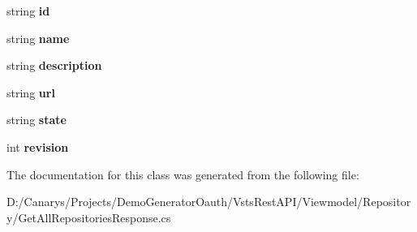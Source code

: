 \begin{DoxyCompactItemize}
\item 
\mbox{\label{class_vsts_rest_a_p_i_1_1_viewmodel_1_1_repository_1_1_get_all_repositories_response_1_1_project_aa93e4a4072d552bdea5a912d2d8b43f8}} 
string {\bfseries id}
\item 
\mbox{\label{class_vsts_rest_a_p_i_1_1_viewmodel_1_1_repository_1_1_get_all_repositories_response_1_1_project_a6f41ccbf88e8fb4ff33bc6472b95cae9}} 
string {\bfseries name}
\item 
\mbox{\label{class_vsts_rest_a_p_i_1_1_viewmodel_1_1_repository_1_1_get_all_repositories_response_1_1_project_a47f4d3463a6b78bf9a33c2718df1b66c}} 
string {\bfseries description}
\item 
\mbox{\label{class_vsts_rest_a_p_i_1_1_viewmodel_1_1_repository_1_1_get_all_repositories_response_1_1_project_ac4682274e4cd61f0adc35f245d61ac2c}} 
string {\bfseries url}
\item 
\mbox{\label{class_vsts_rest_a_p_i_1_1_viewmodel_1_1_repository_1_1_get_all_repositories_response_1_1_project_adad64a69083aa5dcf63f27f3d3b66123}} 
string {\bfseries state}
\item 
\mbox{\label{class_vsts_rest_a_p_i_1_1_viewmodel_1_1_repository_1_1_get_all_repositories_response_1_1_project_aefccc2024ddb73177425f544053ab1d2}} 
int {\bfseries revision}
\end{DoxyCompactItemize}


The documentation for this class was generated from the following file\+:\begin{DoxyCompactItemize}
\item 
D\+:/\+Canarys/\+Projects/\+Demo\+Generator\+Oauth/\+Vsts\+Rest\+A\+P\+I/\+Viewmodel/\+Repository/Get\+All\+Repositories\+Response.\+cs\end{DoxyCompactItemize}
